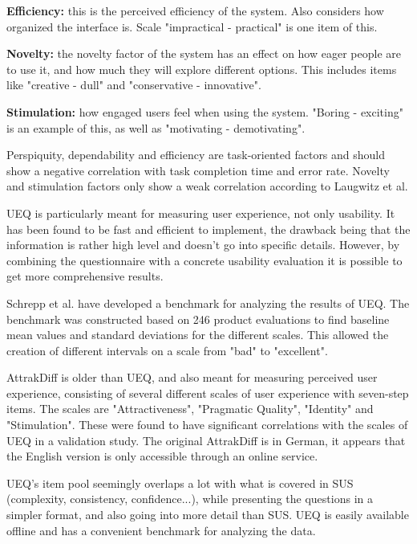 \textbf{Efficiency:} this is the perceived efficiency of the system. Also considers how organized the interface is. Scale "impractical - practical" is one item of this.

\textbf{Novelty:} the novelty factor of the system has an effect on how eager people are to use it, and how much they will explore different options. This includes items like "creative - dull" and "conservative - innovative".

\textbf{Stimulation:} how engaged users feel when using the system. "Boring - exciting" is an example of this, as well as "motivating - demotivating".

Perspiquity, dependability and efficiency are task-oriented factors and should show a negative correlation with task completion time and error rate. Novelty and stimulation factors only show a weak correlation according to Laugwitz et al. \cite{laugwitz2008construction}

UEQ is particularly meant for measuring user experience, not only usability. It has been found to be fast and efficient to implement, the drawback being that the information is rather high level and doesn't go into specific details. However, by combining the questionnaire with a concrete usability evaluation it is possible to get more comprehensive results. \cite{schrepp2014applying, rauschenberger2013efficient}

Schrepp et al. \cite{schrepp2017construction} have developed a benchmark for analyzing the results of UEQ. The benchmark was constructed based on 246 product evaluations to find baseline mean values and standard deviations for the different scales. This allowed the creation of different intervals on a scale from "bad" to "excellent".

AttrakDiff is older than UEQ, and also meant for measuring perceived user experience, consisting of several different scales of user experience with seven-step items. The scales are "Attractiveness", "Pragmatic Quality", "Identity" and "Stimulation". These were found to have significant correlations with the scales of UEQ in a validation study. \cite{laugwitz2008construction} The original AttrakDiff is in German, it appears that the English version is only accessible through an online service. \cite{attrakdiff}

UEQ's item pool seemingly overlaps a lot with what is covered in SUS (complexity, consistency, confidence...), while presenting the questions in a simpler format, and also going into more detail than SUS. UEQ is easily available offline and has a convenient benchmark for analyzing the data.